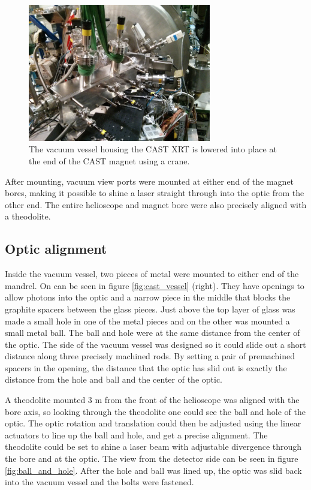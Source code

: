 \begin{figure}[htbp]
  \centering
    \includegraphics[height=6cm]{figures/cast/castxrt_install.jpg}
  \caption{\footnotesize The vacuum vessel housing the CAST XRT is lowered into place at the end of the CAST magnet using a crane.}
  \label{fig:cast_install}
\end{figure}

After mounting, vacuum view ports were mounted at either end of the magnet bores, making it possible to shine a laser straight through into the optic from the other end. The entire helioscope and magnet bore were also precisely aligned with a theodolite.

\subsection{Optic alignment}\label{sec:optic_alignment}
Inside the vacuum vessel, two pieces of metal were mounted to either end of the mandrel. On can be seen in figure \ref{fig:cast_vessel} (right). They have openings to allow photons into the optic and a narrow piece in the middle that blocks the graphite spacers between the glass pieces. Just above the top layer of glass was made a small hole in one of the metal pieces and on the other was mounted a small metal ball. The ball and hole were at the same distance from the center of the optic. The side of the vacuum vessel was designed so it could slide out a short distance along three precisely machined rods. By setting a pair of premachined spacers in the opening, the distance that the optic has slid out is exactly the distance from the hole and ball and the center of the optic.

A theodolite mounted 3 m from the front of the helioscope was aligned with the bore axis, so looking through the theodolite one could see the ball and hole of the optic. The optic rotation and translation could then be adjusted using the linear actuators to line up the ball and hole, and get a precise alignment. The theodolite could be set to shine a laser beam with adjustable divergence through the bore and at the optic. The view from the detector side can be seen in figure \ref{fig:ball_and_hole}. After the hole and ball was lined up, the optic was slid back into the vacuum vessel and the bolts were fastened.


